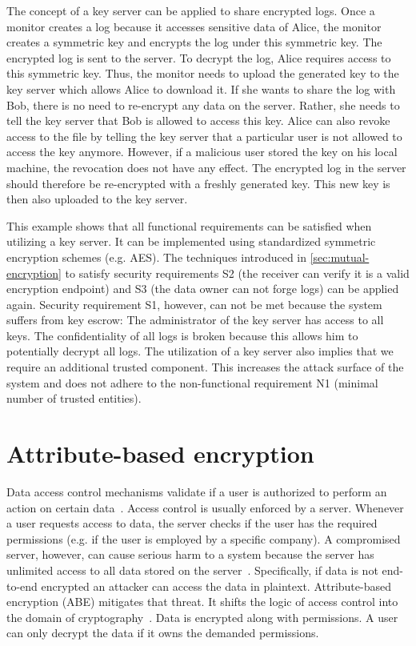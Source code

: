 \documentclass[../main.tex]{subfiles}
\begin{document}
The concept of a key server can be applied to share encrypted logs.
Once a monitor creates a log because it accesses sensitive data of Alice, the monitor creates a symmetric key and encrypts the log under this symmetric key.
The encrypted log is sent to the server.
To decrypt the log, Alice requires access to this symmetric key.
Thus, the monitor needs to upload the generated key to the key server which allows Alice to download it.
If she wants to share the log with Bob, there is no need to re-encrypt any data on the server.
Rather, she needs to tell the key server that Bob is allowed to access this key.
Alice can also revoke access to the file by telling the key server that a particular user is not allowed to access the key anymore.
However, if a malicious user stored the key on his local machine, the revocation does not have any effect.
The encrypted log in the server should therefore be re-encrypted with a freshly generated key.
This new key is then also uploaded to the key server.

This example shows that all functional requirements can be satisfied when utilizing a key server.
It can be implemented using standardized symmetric encryption schemes (e.g. AES).
The techniques introduced in \cref{sec:mutual-encryption} to satisfy security requirements S2 (the receiver can verify it is a valid encryption endpoint) and S3 (the data owner can not forge logs) can be applied again.
Security requirement S1, however, can not be met because the system suffers from key escrow: 
The administrator of the key server has access to all keys.
The confidentiality of all logs is broken because this allows him to potentially decrypt all logs.
The utilization of a key server also implies that we require an additional trusted component.
This increases the attack surface of the system and does not adhere to the non-functional requirement N1 (minimal number of trusted entities).

\section{Attribute-based encryption}
\label{sec:attribute-encryption}
Data access control mechanisms validate if a user is authorized to perform an action on certain data~\cite[242]{Eckert2018}.
Access control is usually enforced by a server.
Whenever a user requests access to data, the server checks if the user has the required permissions (e.g. if the user is employed by a specific company).
A compromised server, however, can cause serious harm to a system because the server has unlimited access to all data stored on the server~\cite{Hagg2022}.
Specifically, if data is not end-to-end encrypted an attacker can access the data in plaintext.
Attribute-based encryption (ABE) mitigates that threat.
It shifts the logic of access control into the domain of cryptography~\cite{Bethencourt2007}.
Data is encrypted along with permissions.
A user can only decrypt the data if it owns the demanded permissions.
\end{document}
